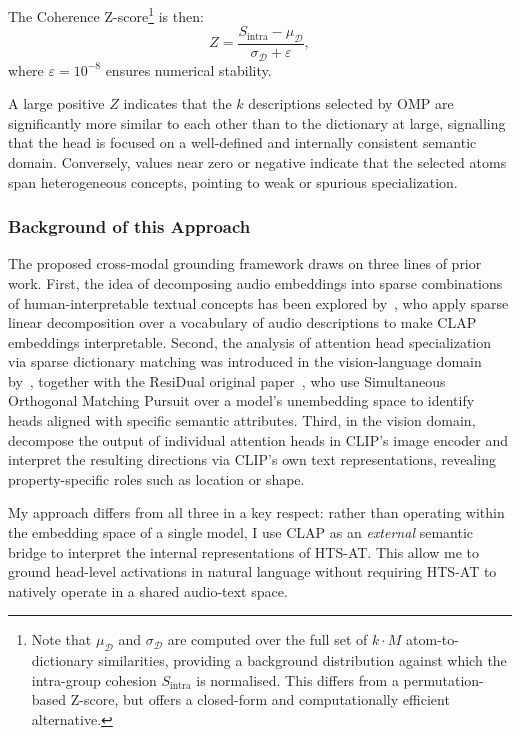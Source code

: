 The Coherence Z-score\footnote{Note that $\mu_{\mathcal{D}}$ and $\sigma_{\mathcal{D}}$ are computed 
over the full set of $k \cdot M$ atom-to-dictionary similarities, providing 
a background distribution against which the intra-group cohesion $S_{\mathrm{intra}}$ 
is normalised. This differs from a permutation-based Z-score, but offers a 
closed-form and computationally efficient alternative.} is then:
\begin{equation}
\label{eq:coherence_z}
Z = \frac{S_{\mathrm{intra}} - \mu_{\mathcal{D}}}{\sigma_{\mathcal{D}} + \varepsilon},
\end{equation}
where $\varepsilon = 10^{-8}$ ensures numerical stability.
 
A large positive $Z$ indicates that the $k$ descriptions selected by OMP are 
significantly more similar to each other than to the dictionary at large, signalling 
that the head is focused on a well-defined and internally consistent semantic domain. 
Conversely, values near zero or negative indicate that the selected atoms span 
heterogeneous concepts, pointing to weak or spurious specialization.

\subsubsection{Background of this Approach}
The proposed cross-modal grounding framework draws on three lines of prior work.
First, the idea of decomposing audio embeddings into sparse combinations of 
human-interpretable textual concepts has been explored by~\citet{audioembeddings}, 
who apply sparse linear decomposition over a vocabulary of audio descriptions 
to make CLAP embeddings interpretable.
Second, the analysis of attention head specialization via sparse dictionary 
matching was introduced in the vision-language domain by~\citet{basile}, together with the ResiDual 
original paper~\citet{residual2024}, 
who use Simultaneous Orthogonal Matching Pursuit over a model's unembedding space 
to identify heads aligned with specific semantic attributes.
Third, in the vision domain,~\citet{gandelsman2024} decompose 
the output of individual attention heads in CLIP's image encoder and interpret 
the resulting directions via CLIP's own text representations, revealing 
property-specific roles such as location or shape.

My approach differs from all three in a key respect: rather than operating 
within the embedding space of a single model, I use CLAP as an \emph{external} 
semantic bridge to interpret the internal representations of  
HTS-AT. This allow me to ground head-level activations 
in natural language without requiring HTS-AT to natively operate 
in a shared audio-text space.
 
